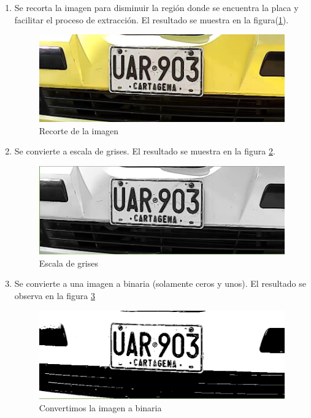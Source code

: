  \begin{enumerate}
     \item  Se recorta la imagen para disminuir la región donde se encuentra la placa y facilitar el proceso de extracción. El resultado se muestra en la figura(\ref{fig:recorter}).
     
    \begin{figure}[H]
    \centering
    \includegraphics[width=0.5 \linewidth]{imagenes/MODELO_4/segmentacion/recorte.jpg} 
    \caption{ Recorte de la imagen}
    \label{fig:recorter}
    \end{figure}
     
     \item Se convierte a escala de grises. El resultado se muestra en la figura \ref{fig:Escala de grises}.
     
     \begin{figure}[H]
    \centering
    \includegraphics[width=0.5 \linewidth]{imagenes/MODELO_4/segmentacion/gris.jpg} 
    \caption{ Escala de grises}
    \label{fig:Escala de grises}
    \end{figure}
    
     \item Se convierte a una imagen a binaria (solamente ceros y unos). El resultado se observa en la figura \ref{fig:Convertimos la imagen a binaria}
     
     \begin{figure}[H]
    \centering
    \includegraphics[width=0.5 \linewidth]{imagenes/MODELO_4/segmentacion/umbral.jpg} \caption{Convertimos la imagen a binaria}
    \label{fig:Convertimos la imagen a binaria}
    \end{figure}
     

\end{enumerate}

